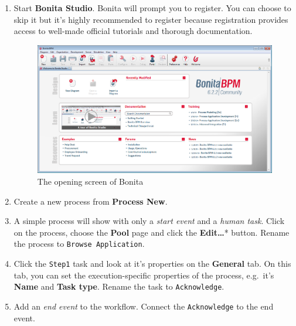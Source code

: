 \documentclass[]{report}
\let\Oldincludegraphics\includegraphics
\renewcommand{\includegraphics}[1]{
\begin{adjustbox}{max size={\textwidth}{\textheight}}
    \Oldincludegraphics[scale=0.6]{#1}%
\end{adjustbox}
}
\begin{document}
\begin{enumerate}
\def\labelenumi{\arabic{enumi}.}
\item
  Start \textbf{Bonita Studio}. Bonita will prompt you to register. You
  can choose to skip it but it's highly recommended to register because
  registration provides access to well-made official tutorials and
  thorough documentation.

  \begin{figure}[htbp]
  \centering
  \includegraphics{img/bpmn/bonita_opening.png}
  \caption{The opening screen of Bonita}
  \end{figure}
\item
  Create a new process from \textbf{Process \textbar{} New}.
\item
  A simple process will show with only a \emph{start event} and a
  \emph{human task}. Click on the process, choose the \textbf{Pool} page
  and click the \textbf{Edit\ldots{}}* button. Rename the process to
  \texttt{Browse Application}.
\item
  Click the \texttt{Step1} task and look at it's properties on the
  \textbf{General} tab. On this tab, you can set the execution-specific
  properties of the process, e.g.~it's \textbf{Name} and \textbf{Task
  type}. Rename the task to \texttt{Acknowledge}.
\item
  Add an \emph{end event} to the workflow. Connect the
  \texttt{Acknowledge} to the end event.


\end{enumerate}
\end{document}
